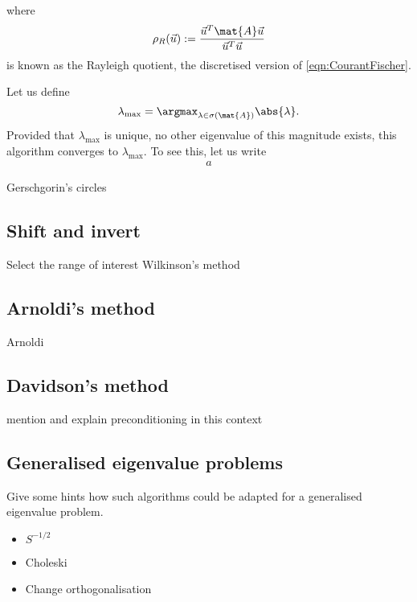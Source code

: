 
where
\[ \rho_R(\vec{u}) := \frac{\vec{u}^T \mat{A} \vec{u}}{\vec{u}^T \vec{u}} \]
is known as the Rayleigh quotient,
the discretised version of \eqref{eqn:CourantFischer}.

Let us define
\[ \lambda_\text{max} = \argmax_{\lambda \in \sigma(\mat{A})} \abs{\lambda}. \]
Provided that $\lambda_\text{max}$ is unique,
\ie no other eigenvalue of this magnitude exists,
this algorithm converges to $\lambda_\text{max}$.
To see this, let us write
\begin{align}
	a
\end{align}

Gerschgorin's circles



\subsection{Shift and invert}
\label{sec:ShiftInvert}
Select the range of interest
Wilkinson's method

\subsection{Arnoldi's method}
\label{sec:Arnoldi}
Arnoldi~\cite{Arnoldi1951}

\subsection{Davidson's method}
\label{sec:Davidson}

mention and explain preconditioning in this context

\subsection{Generalised eigenvalue problems}
\label{sec:GeneralisedEigenvalueProblem}
Give some hints how such algorithms
could be adapted for a generalised eigenvalue problem.


\begin{itemize}
	\item $S^{-1/2}$
	\item Choleski
	\item Change orthogonalisation
\end{itemize}


